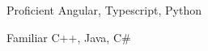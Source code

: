 

\begin{cvskills}

  \cvskill
    {Proficient} %
    {Angular, Typescript, Python} %
    
  \cvskill
    {Familiar} %
    {C++, Java, C\#} %

\end{cvskills}

